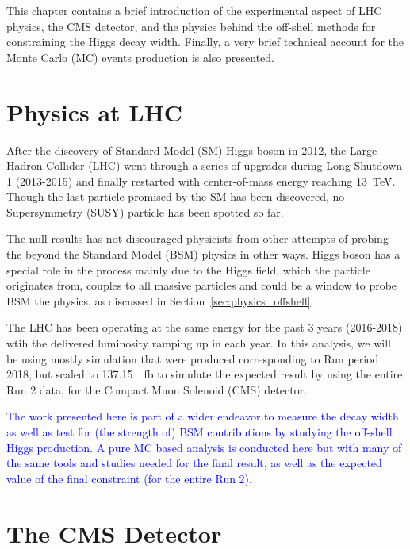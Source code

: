 This chapter contains a brief introduction of the experimental aspect of
LHC physics, the CMS detector, and the physics behind the off-shell methods
for constraining the Higgs decay width. Finally, a very brief technical account for
the Monte Carlo (MC) events production is also presented.

\section{Physics at LHC}
After the discovery of Standard Model (SM) Higgs boson in 2012, the Large Hadron Collider (LHC)
went through a series of upgrades during Long Shutdown 1 (2013-2015) and finally restarted with center-of-mass energy reaching
\SI{13}{\tera\electronvolt}. Though the last particle promised by the SM has been discovered,
no Supersymmetry (SUSY) particle has been spotted so far.

The null results has not discouraged physicists from other attempts of probing the 
beyond the Standard Model (BSM) physics in other ways. Higgs boson has a special role in
the process mainly due to the Higgs field, which the particle originates from, couples to all 
massive particles and could be a window to probe BSM the physics, 
as discussed in Section~\ref{sec:physics_offshell}.

The LHC has been operating at the same energy for the past 3 years (2016-2018) wtih 
the delivered luminosity ramping up in each year\cite{luminosity}. In this analysis, we will be using
mostly simulation that were produced corresponding to Run period 2018, but scaled to 
\SI{137.15}{\per\femto\barn} to simulate the expected result by using the entire Run 2 data,
for the Compact Muon Solenoid (CMS) detector.

\textcolor{blue}{The work presented here is part of a wider endeavor to measure the decay width as well
    as test for (the strength of) BSM contributions by studying the off-shell Higgs production. A pure
    MC based analysis is conducted here but with many of the same tools and studies needed for the final
    result, as well as the expected value of the final constraint (for the entire Run 2).
}

\section{The CMS Detector}

